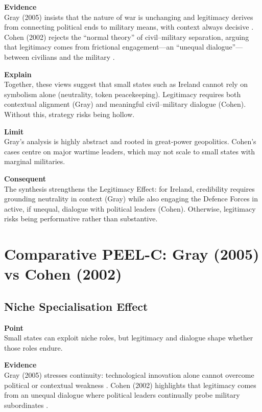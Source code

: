 \textbf{Evidence} \\
Gray (2005) insists that the nature of war is unchanging and legitimacy derives from connecting political ends to military means, with context always decisive \parencite{GRAY_2005}.  
Cohen (2002) rejects the ``normal theory'' of civil--military separation, arguing that legitimacy comes from frictional engagement---an ``unequal dialogue''---between civilians and the military \parencite{COHEN_2002}.  

\textbf{Explain} \\
Together, these views suggest that small states such as Ireland cannot rely on symbolism alone (neutrality, token peacekeeping). Legitimacy requires both contextual alignment (Gray) and meaningful civil--military dialogue (Cohen). Without this, strategy risks being hollow.  

\textbf{Limit} \\
Gray’s analysis is highly abstract and rooted in great-power geopolitics. Cohen’s cases centre on major wartime leaders, which may not scale to small states with marginal militaries.  

\textbf{Consequent} \\
The synthesis strengthens the Legitimacy Effect: for Ireland, credibility requires grounding neutrality in context (Gray) while also engaging the Defence Forces in active, if unequal, dialogue with political leaders (Cohen). Otherwise, legitimacy risks being performative rather than substantive.  

\section*{Comparative PEEL-C: Gray (2005) vs Cohen (2002)}

\subsection*{Niche Specialisation Effect}

\textbf{Point} \\
Small states can exploit niche roles, but legitimacy and dialogue shape whether those roles endure.

\textbf{Evidence} \\
Gray (2005) stresses continuity: technological innovation alone cannot overcome political or contextual weakness \parencite{GRAY_2005}.  
Cohen (2002) highlights that legitimacy comes from an unequal dialogue where political leaders continually probe military subordinates \parencite{COHEN_2002}.  

